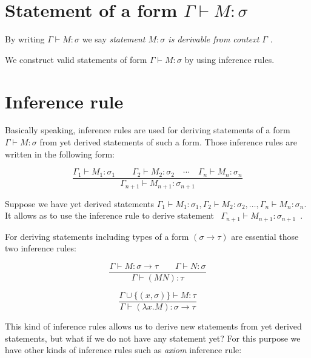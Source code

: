 \documentclass[12pt,a4paper]{report}
\newcommand{\turst}[3]{$#1 \vdash #2 : #3$\xspace}
\newcommand{\GMS}{\turst{\Gamma}{M}{\sigma}}
\begin{document}
	
	
\section{Statement of a form \GMS}

	By writing \GMS we say 
	{\it statement $M : \sigma$ is derivable from context $\Gamma$ }.

	We construct valid statements of form \GMS by using inference rules.
	
		
\section{Inference rule}		
	
	Basically speaking, inference rules are used for deriving statements of a form 
	\GMS from yet derived statements of such a form.
	Those inference rules are written in the following form:
	
	\begin{equation*}
		\frac{\Gamma_1 \vdash M_1 : \sigma_1 \qquad
			  \Gamma_2 \vdash M_2 : \sigma_2 \quad
			  \dotsm \quad
		      \Gamma_n \vdash M_n : \sigma_n}
		     {\Gamma_{n+1} \vdash M_{n+1} : \sigma_{n+1}}
	\end{equation*}	
	
	Suppose we have yet derived statements 
	$\Gamma_1 \vdash M_1 : \sigma_1 ,
	 \Gamma_2 \vdash M_2 : \sigma_2 ,
	 \dots ,
	 \Gamma_n \vdash M_n : \sigma_n$. 
	It allows as to use the inference rule to derive statement
	\mbox{ $\Gamma_{n+1} \vdash M_{n+1} : \sigma_{n+1}$ }.
	 
	For deriving statements including types of a form 
	$(\sigma \rightarrow \tau)$ are essential those two 
	inference rules:
	
	\begin{equation*}
		\frac{\Gamma \vdash M : \sigma \rightarrow \tau \qquad
			  \Gamma \vdash N : \sigma }
		     {\Gamma \vdash (M N) : \tau }
	\end{equation*}	
	
	\begin{equation*}
		\frac{\Gamma \cup \{ ( x,\sigma ) \} \vdash M : \tau }
		     {\Gamma \vdash (\lambda x . M) : \sigma \rightarrow \tau }
	\end{equation*}		 
	 
	This kind of inference rules allows us to derive new statements from yet derived statements, but 
	what if we do not have any statement yet? 
	For this purpose we have other kinds of inference rules such as {\it axiom} inference rule:   
	
\end{document}
